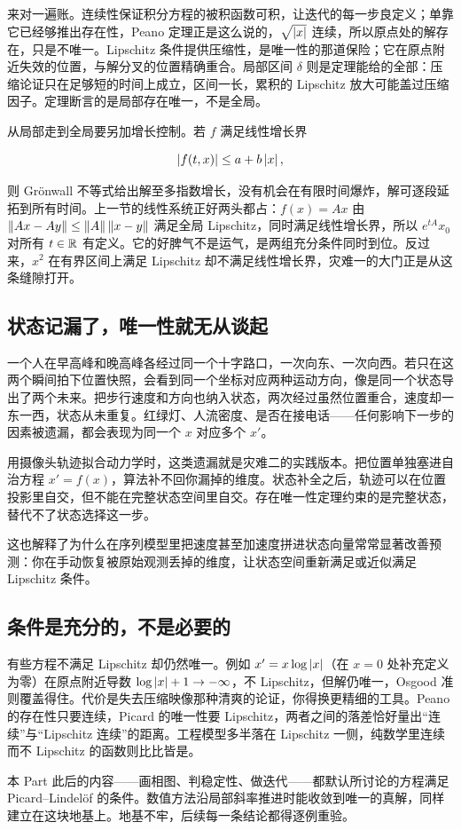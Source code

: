 来对一遍账。连续性保证积分方程的被积函数可积，让迭代的每一步良定义；单靠它已经够推出存在性，Peano 定理正是这么说的，\(\sqrt{\left|x\right|}\) 连续，所以原点处的解存在，只是不唯一。Lipschitz 条件提供压缩性，是唯一性的那道保险；它在原点附近失效的位置，与解分叉的位置精确重合。局部区间 \(\delta\) 则是定理能给的全部：压缩论证只在足够短的时间上成立，区间一长，累积的 Lipschitz 放大可能盖过压缩因子。定理断言的是局部存在唯一，不是全局。

从局部走到全局要另加增长控制。若 \(f\) 满足线性增长界

\[
\left|f(t,x)\right|\le a+b\left|x\right|,
\]

则 Grönwall 不等式给出解至多指数增长，没有机会在有限时间爆炸，解可逐段延拓到所有时间。上一节的线性系统正好两头都占：\(f(x)=Ax\) 由 \(\left\lVert Ax-Ay\right\rVert\le\left\lVert A\right\rVert\left\lVert x-y\right\rVert\) 满足全局 Lipschitz，同时满足线性增长界，所以 \(e^{tA}x_0\) 对所有 \(t\in\mathbb{R}\) 有定义。它的好脾气不是运气，是两组充分条件同时到位。反过来，\(x^2\) 在有界区间上满足 Lipschitz 却不满足线性增长界，灾难一的大门正是从这条缝隙打开。

\subsection{状态记漏了，唯一性就无从谈起}

一个人在早高峰和晚高峰各经过同一个十字路口，一次向东、一次向西。若只在这两个瞬间拍下位置快照，会看到同一个坐标对应两种运动方向，像是同一个状态导出了两个未来。把步行速度和方向也纳入状态，两次经过虽然位置重合，速度却一东一西，状态从未重复。红绿灯、人流密度、是否在接电话——任何影响下一步的因素被遗漏，都会表现为同一个 \(x\) 对应多个 \(x'\)。

用摄像头轨迹拟合动力学时，这类遗漏就是灾难二的实践版本。把位置单独塞进自治方程 \(x'=f(x)\)，算法补不回你漏掉的维度。状态补全之后，轨迹可以在位置投影里自交，但不能在完整状态空间里自交。存在唯一性定理约束的是完整状态，替代不了状态选择这一步。

这也解释了为什么在序列模型里把速度甚至加速度拼进状态向量常常显著改善预测：你在手动恢复被原始观测丢掉的维度，让状态空间重新满足或近似满足 Lipschitz 条件。

\subsection{条件是充分的，不是必要的}

有些方程不满足 Lipschitz 却仍然唯一。例如 \(x'=x\log\left|x\right|\)（在 \(x=0\) 处补充定义为零）在原点附近导数 \(\log\left|x\right|+1\to-\infty\)，不 Lipschitz，但解仍唯一，Osgood 准则覆盖得住。代价是失去压缩映像那种清爽的论证，你得换更精细的工具。Peano 的存在性只要连续，Picard 的唯一性要 Lipschitz，两者之间的落差恰好量出``连续''与``Lipschitz 连续''的距离。工程模型多半落在 Lipschitz 一侧，纯数学里连续而不 Lipschitz 的函数则比比皆是。

本 Part 此后的内容——画相图、判稳定性、做迭代——都默认所讨论的方程满足 Picard--Lindelöf 的条件。数值方法沿局部斜率推进时能收敛到唯一的真解，同样建立在这块地基上。地基不牢，后续每一条结论都得逐例重验。
